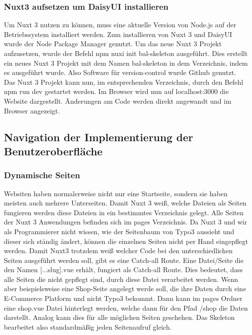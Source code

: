 \subsubsection{Nuxt3 aufsetzen um DaisyUI installieren}
\label{sec:Nuxt3 aufsetzen um DaisyUI installieren}
Um Nuxt 3 nutzen zu können, muss eine aktuelle Version von Node.js auf der Betriebssystem installiert werden. Zum installieren von Nuxt 3 und DaisyUI wurde der Node Package Manager genutzt. Um das neue Nuxt 3 Projekt aufzusetzen, wurde der Befehl npm nuxi init bal-skeleton ausgeführt. Dies erstellt ein neues Nuxt 3 Projekt mit dem Namen bal-skeleton in dem Verzeichnis, indem es ausgeführt wurde. Also Software für version-control wurde Github genutzt. Das Nuxt 3 Projekt kann nun, im entsprechenden Verzeichnis, durch den Befehl npm run dev gestartet werden. Im Browser wird nun auf localhost:3000 die Website dargestellt. Änderungen am Code werden direkt angewandt und im Browser angezeigt.

\subsection{Navigation der Implementierung der Benutzeroberfläche}
\label{sec:Navigation der der ImplementierungBenutzeroberflaeche}

\subsubsection{Dynamische Seiten}
\label{sec:Dynamische Seiten}
Websiten haben normalerweise nicht nur eine Startseite, sondern sie haben meisten auch mehrere Unterseiten. Damit Nuxt 3 weiß, welche Dateien als Seiten fungieren werden diese Dateien in ein bestimmtes Verzeichnis gelegt. Alle Seiten der Nuxt 3 Anwendungen befinden sich im pages Verzeichnis. Da Nuxt 3 und wir als Programmierer nicht wissen, wie der Seitenbaum von Typo3 aussieht und dieser sich ständig ändert, können die einzelnen Seiten nicht per Hand eingepflegt werden. Damit Nuxt3 trotzdem weiß welcher Code bei den unterschiedlichen Seiten ausgeführt werden soll, gibt es eine Catch-all Route. Eine Datei/Seite die den Namen [...slug].vue erhält, fungiert als Catch-all Route. Dies bedeutet, dass alle Seiten die nicht gepflegt sind, durch diese Datei verarbeitet werden. Wenn aber beispielsweise eine Shop-Seite angelegt werde soll, die ihre Daten durch eine E-Commerce Platform und nicht Typo3 bekommt. Dann kann im pages Ordner eine shop.vue Datei hinterlegt werden, welche dann für den Pfad /shop die Daten darstellt. Analog kann dies für alle möglichen Seiten geschehen. Das Skeleton bearbeitet also standardmäßig jeden Seitenaufruf gleich.

